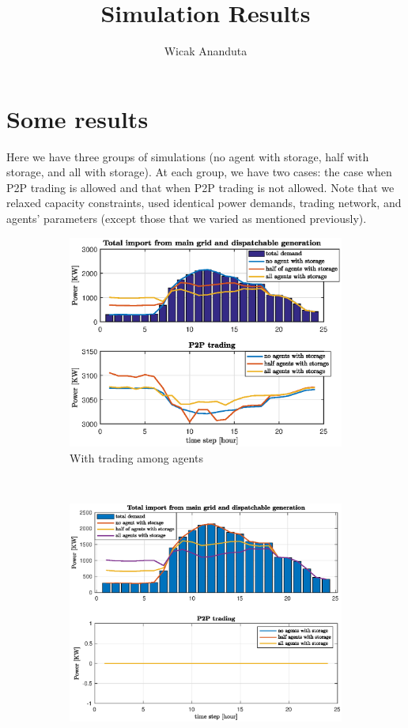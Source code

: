 \documentclass[10pt]{article}
\title{Simulation Results}
\author{Wicak Ananduta}
\newtheorem{definitiox	n}{Definition}{\it}{}
\newcommand{\0}{\mathbf{0}}
\newcommand{\1}{\mathbf{1}}
\begin{document}
\maketitle
\vspace{-20pt}
\section{Some results}
Here we have three groups of simulations (no agent with storage, half with storage, and all with storage). At each group, we have two cases: the case when P2P trading is allowed and that when P2P trading is not allowed. Note that we relaxed capacity constraints, used identical power demands, trading network, and agents' parameters (except those that we varied as mentioned previously). 
\begin{figure}[h]
    \centering
    \begin{subfigure}{0.5\textwidth}
        \centering
        \includegraphics[width=1\linewidth]{simA_sto_37_3wtrade.eps}
        \caption{With trading among agents}
    \end{subfigure}%
    ~ 
    \begin{subfigure}{0.5\textwidth}
        \centering
        \includegraphics[width=1\linewidth]{simA_sto_37_3notrade.eps}

\end{subfigure}
\end{figure}
\end{document}
